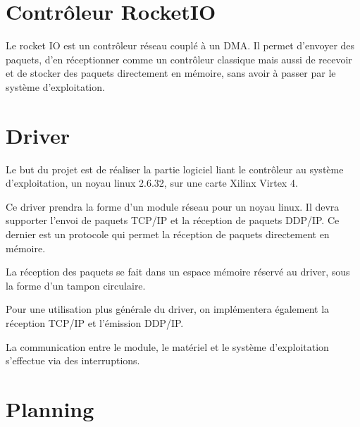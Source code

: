\newcommand{\TITLE}{Cahier des Charges}



\section{Contrôleur RocketIO}

Le rocket IO est un contrôleur réseau couplé à un DMA. Il permet 
d'envoyer des paquets, d'en réceptionner comme un contrôleur classique
mais aussi de recevoir et de stocker des paquets directement en mémoire,
sans avoir à passer par le système d'exploitation.

\section{Driver}

Le but du projet est de réaliser la partie logiciel liant le contrôleur 
au système d'exploitation, un noyau linux 2.6.32, sur une carte Xilinx
Virtex 4.

Ce driver prendra la forme d'un module réseau pour un noyau linux. Il 
devra supporter l'envoi de paquets TCP/IP et la réception de paquets DDP/IP.
Ce dernier est un protocole qui permet la réception de paquets directement
en mémoire. 

La réception des paquets se fait dans un espace mémoire réservé au driver,
sous la forme d'un tampon circulaire. 

Pour une utilisation plus générale du driver, on implémentera également la 
réception TCP/IP et l'émission DDP/IP.

La communication entre le module, le matériel et le 
système d'exploitation s'effectue via des interruptions.

\section{Planning}

